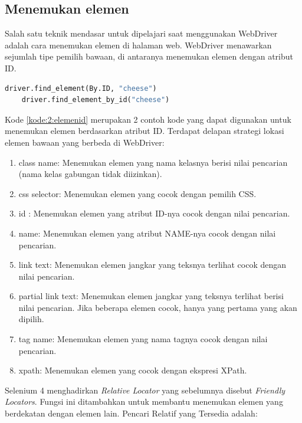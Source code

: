 \subsection{Menemukan elemen}
Salah satu teknik mendasar untuk dipelajari saat menggunakan WebDriver adalah cara menemukan elemen di halaman web. WebDriver menawarkan sejumlah tipe pemilih bawaan, di antaranya menemukan elemen dengan atribut ID.
\begin{lstlisting}[language=python, caption=Contoh kode untuk menemukan elemen dengan atribut ID, label=kode:2:elemenid]
	driver.find_element(By.ID, "cheese")	
	driver.find_element_by_id("cheese")
\end{lstlisting}
Kode \ref{kode:2:elemenid} merupakan 2 contoh kode yang dapat digunakan untuk menemukan elemen berdasarkan atribut ID. Terdapat delapan strategi lokasi elemen bawaan yang berbeda di WebDriver:
\begin{enumerate}
	\item class name: Menemukan elemen yang nama kelasnya berisi nilai pencarian (nama kelas gabungan tidak diizinkan).
	\item css selector: Menemukan elemen yang cocok dengan pemilih CSS.
	\item id : Menemukan elemen yang atribut ID-nya cocok dengan nilai pencarian.
	\item name: Menemukan elemen yang atribut NAME-nya cocok dengan nilai pencarian. 
	\item link text: Menemukan elemen jangkar yang teksnya terlihat cocok dengan nilai pencarian. 
	\item partial link text: Menemukan elemen jangkar yang teksnya terlihat berisi nilai pencarian. Jika beberapa elemen cocok, hanya yang pertama yang akan dipilih.
	\item tag name: Menemukan elemen yang nama tagnya cocok dengan nilai pencarian.
	\item xpath: Menemukan elemen yang cocok dengan ekspresi XPath.
\end{enumerate}
Selenium 4 menghadirkan \textit{Relative Locator} yang sebelumnya disebut \textit{Friendly Locators}. Fungsi ini ditambahkan untuk membantu menemukan elemen yang berdekatan dengan elemen lain. Pencari Relatif yang Tersedia adalah:
